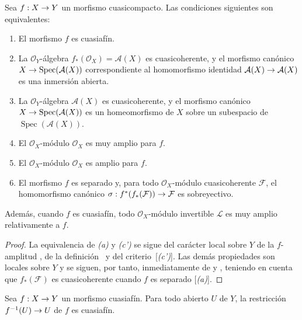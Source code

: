 \documentclass[oneside,10pt]{amsart}
\makeatletter
\newcommand{\ega@arrow}[2]{\mathchoice{#1}{#2}{#2}{#2}}
\renewcommand{\to}{\ega@arrow{\longrightarrow}{\rightarrow}}
\newcommand{\oldpage}[2][]{\marginnote{\normalfont\footnotesize\textbf{#1}~|~#2}\ignorespaces}
\let\EGAOriginalLabel\label
\renewcommand{\label}[1]{\phantomsection\EGAOriginalLabel{#1}}
\makeatother
\begin{document}
\begin{proposition}[5.1.6]
\label{II.5.1.6-fr}
Sea $f:X\to Y$ un morfismo cuasicompacto.
Las condiciones siguientes son equivalentes:
\begin{enumerate}
  \item[{\rm(a)}] El morfismo $f$ es cuasiafín.
  \item[{\rm(b)}] La $\mathcal{O}_Y$-álgebra $f_*(\mathcal{O}_X)=\mathcal{A}(X)$ es cuasicoherente, y el morfismo canónico $X\to\operatorname{Spec}(\mathcal{A}(X))$ correspondiente al homomorfismo identidad $\mathcal{A}(X)\to\mathcal{A}(X)$ \textup{} es una inmersión abierta.
  \item[{\rm(b')}] La $\mathcal{O}_Y$-álgebra $\mathcal{A}(X)$ es cuasicoherente, y el morfismo canónico $X\to\operatorname{Spec}(\mathcal{A}(X))$ es un homeomorfismo de $X$ sobre un subespacio de $\operatorname{Spec}(\mathcal{A}(X))$.
  \item[{\rm(c)}] El $\mathcal{O}_X$-módulo $\mathcal{O}_X$ es muy amplio para $f$.
  \item[{\rm(c')}] El $\mathcal{O}_X$-módulo $\mathcal{O}_X$ es amplio para $f$.
  \item[{\rm(d)}] El morfismo $f$ es separado y, para todo $\mathcal{O}_X$-módulo cuasicoherente $\mathcal{F}$, el homomorfismo canónico $\sigma:f^*(f_*(\mathcal{F}))\to\mathcal{F}$  es sobreyectivo.
\end{enumerate}

Además, cuando $f$ es cuasiafín, todo $\mathcal{O}_X$-módulo invertible $\mathcal{L}$ es muy amplio relativamente a $f$.
\end{proposition}

\begin{proof}
La equivalencia de \emph{(a)} y \emph{(c')} se sigue del carácter local sobre $Y$ de la $f$-amplitud , de la definición~ y del criterio~[\emph{(c')}].
Las demás propiedades son locales sobre $Y$
\oldpage[II]{96}
y se siguen, por tanto, inmediatamente de  y , teniendo en cuenta que $f_*(\mathcal{F})$ es cuasicoherente cuando $f$ es separado [\emph{(a)}].
\end{proof}

\begin{corollary}[5.1.7]
\label{II.5.1.7-fr}
Sea $f:X\to Y$ un morfismo cuasiafín.
Para todo abierto $U$ de $Y$, la restricción $f^{-1}(U)\to U$ de $f$ es cuasiafín.
\end{corollary}
\end{document}
